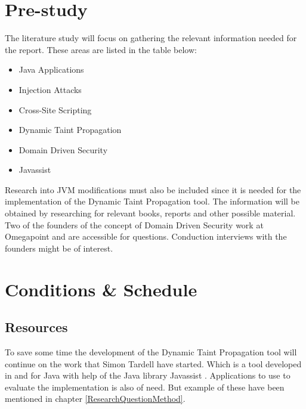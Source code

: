 \documentclass{../kththesis}
\begin{document}
\chapter{Pre-study} \label{Pre-study}
The literature study will focus on gathering the relevant information needed for the report. These areas are listed in the table below:
	
	\begin{itemize}  
		\item Java Applications
		\item Injection Attacks
		\item Cross-Site Scripting
		\item Dynamic Taint Propagation
		\item Domain Driven Security
		\item Javassist
	\end{itemize}

\noindent
Research into JVM modifications must also be included since it is needed for the implementation of the Dynamic Taint Propagation tool. The information will be obtained by researching for relevant books, reports and other possible material. Two of the founders of the concept of Domain Driven Security work at Omegapoint and are accessible for questions. Conduction interviews with the founders might be of interest.



\chapter{Conditions \& Schedule}
\section{Resources}
To save some time the development of the Dynamic Taint Propagation tool will continue on the work that Simon Tardell have started. Which is a tool developed in and for Java with help of the Java library Javassist \parencite{Javassist}. Applications to use to evaluate the implementation is also of need. But example of these have been mentioned in chapter \ref{ResearchQuestionMethod}.
\end{document}
